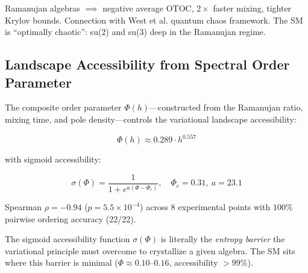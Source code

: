 Ramanujan algebras $\implies$ negative average OTOC, $2\times$ faster mixing, tighter Krylov bounds. Connection with West et al. quantum chaos framework. The SM is ``optimally chaotic'': su(2) and su(3) deep in the Ramanujan regime.

\subsection{Landscape Accessibility from Spectral Order Parameter}\label{sec:landscape_accessibility}

The composite order parameter $\Phi(h)$---constructed from the Ramanujan ratio, mixing time, and pole density---controls the variational landscape accessibility:

\begin{equation}
\Phi(h) \approx 0.289 \cdot h^{0.557}
\end{equation}

with sigmoid accessibility:

\begin{equation}
\sigma(\Phi) = \frac{1}{1 + e^{a(\Phi - \Phi_c)}}, \quad \Phi_c = 0.31, \ a = 23.1
\end{equation}

Spearman $\rho = -0.94$ ($p = 5.5 \times 10^{-4}$) across $8$ experimental points with $100\%$ pairwise ordering accuracy (22/22).

The sigmoid accessibility function $\sigma(\Phi)$ is literally the \emph{entropy barrier} the variational principle must overcome to crystallize a given algebra. The SM sits where this barrier is minimal ($\Phi \approx 0.10$--$0.16$, accessibility $> 99\%$).
